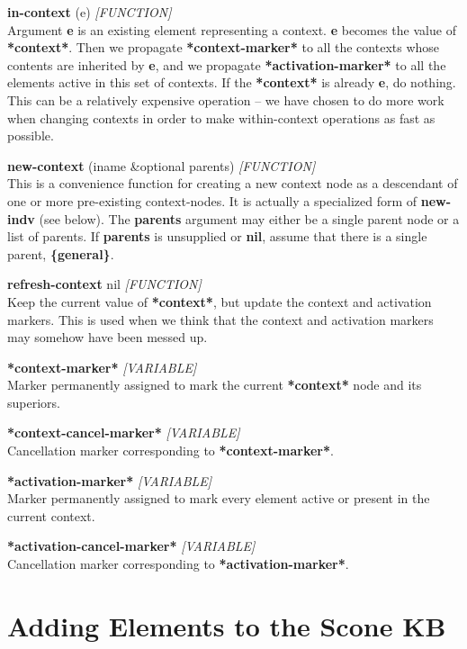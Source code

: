 \documentclass[titlepage,twoside,openright,11pt]{article}
\begin{document}
\textbf{in-context} (e) \emph{{[}FUNCTION{]}\\
}Argument \textbf{e} is an existing element representing a context.
\textbf{e} becomes the value of \textbf{*context*}. Then we propagate
\textbf{*context-marker*} to all the contexts whose contents are
inherited by \textbf{e}, and we propagate \textbf{*activation-marker*}
to all the elements active in this set of contexts. If the
\textbf{*context*} is already \textbf{e}, do nothing. This can be a
relatively expensive operation -- we have chosen to do more work when
changing contexts in order to make within-context operations as fast as
possible.

\textbf{new-context} (iname \&optional parents) \emph{{[}FUNCTION{]}}\\
This is a convenience function for creating a new context node as a
descendant of one or more pre-existing context-nodes. It is actually a
specialized form of \textbf{new-indv} (see below). The \textbf{parents}
argument may either be a single parent node or a list of parents. If
\textbf{parents} is unsupplied or \textbf{nil}, assume that there is a
single parent, \textbf{\{general\}}.

\textbf{refresh-context} nil \emph{{[}FUNCTION{]}}\\
Keep the current value of \textbf{*context*}, but update the context and
activation markers. This is used when we think that the context and
activation markers may somehow have been messed up.

\textbf{*context-marker*} \emph{{[}VARIABLE{]}}\\
Marker permanently assigned to mark the current \textbf{*context*} node
and its superiors.

\textbf{*context-cancel-marker*} \emph{{[}VARIABLE{]}}\\
Cancellation marker corresponding to \textbf{*context-marker*}.

\textbf{*activation-marker*} \emph{{[}VARIABLE{]}}\\
Marker permanently assigned to mark every element active or present in
the current context.

\textbf{*activation-cancel-marker*} \emph{{[}VARIABLE{]}}\\
Cancellation marker corresponding to \textbf{*activation-marker*}.

\section{Adding Elements to the Scone
KB}\label{adding-elements-to-the-scone-kb}
\end{document}
